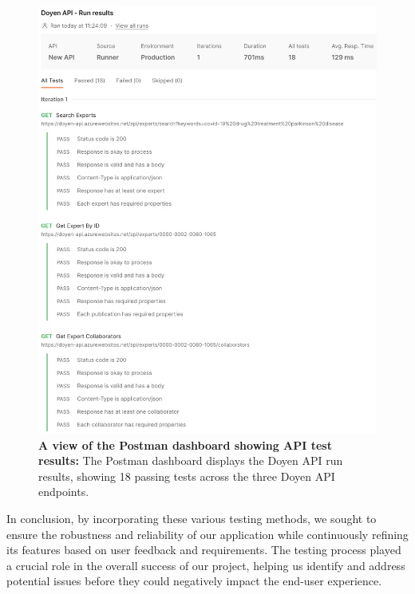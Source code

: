 \begin{figure}[htp!]
    \centering
    \includegraphics[width=\textwidth]{Images/api-tests.png}
    \caption[API Test Results in Postman Dashboard]{\textbf{A view of the Postman dashboard showing API test results:} The Postman dashboard displays the Doyen API run results, showing 18 passing tests across the three Doyen API endpoints. }
    \label{fig:api-tests}
\end{figure}

In conclusion, by incorporating these various testing methods, we sought to ensure the robustness and reliability of our application while continuously refining its features based on user feedback and requirements. The testing process played a crucial role in the overall success of our project, helping us identify and address potential issues before they could negatively impact the end-user experience.